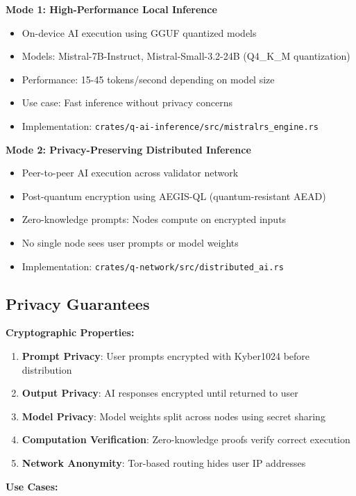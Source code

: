 \documentclass[11pt,a4paper]{scrartcl}
\begin{document}
\textbf{Mode 1: High-Performance Local Inference}
\begin{itemize}
\item On-device AI execution using GGUF quantized models
\item Models: Mistral-7B-Instruct, Mistral-Small-3.2-24B (Q4\_K\_M quantization)
\item Performance: 15-45 tokens/second depending on model size
\item Use case: Fast inference without privacy concerns
\item Implementation: \texttt{crates/q-ai-inference/src/mistralrs\_engine.rs}
\end{itemize}

\textbf{Mode 2: Privacy-Preserving Distributed Inference}
\begin{itemize}
\item Peer-to-peer AI execution across validator network
\item Post-quantum encryption using AEGIS-QL (quantum-resistant AEAD)
\item Zero-knowledge prompts: Nodes compute on encrypted inputs
\item No single node sees user prompts or model weights
\item Implementation: \texttt{crates/q-network/src/distributed\_ai.rs}
\end{itemize}

\subsection{Privacy Guarantees}

\textbf{Cryptographic Properties:}

\begin{enumerate}
\item \textbf{Prompt Privacy}: User prompts encrypted with Kyber1024 before distribution
\item \textbf{Output Privacy}: AI responses encrypted until returned to user
\item \textbf{Model Privacy}: Model weights split across nodes using secret sharing
\item \textbf{Computation Verification}: Zero-knowledge proofs verify correct execution
\item \textbf{Network Anonymity}: Tor-based routing hides user IP addresses
\end{enumerate}

\textbf{Use Cases:}
\end{document}
